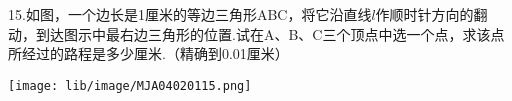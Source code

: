15.如图，一个边长是1厘米的等边三角形ABC，将它沿直线$l$作顺时针方向的翻动，到达图示中最右边三角形的位置.试在A、B、C三个顶点中选一个点，求该点所经过的路程是多少厘米.（精确到0.01厘米）

\begin{flushright}

    \texttt{[image: lib/image/MJA04020115.png]}

\end{flushright}



